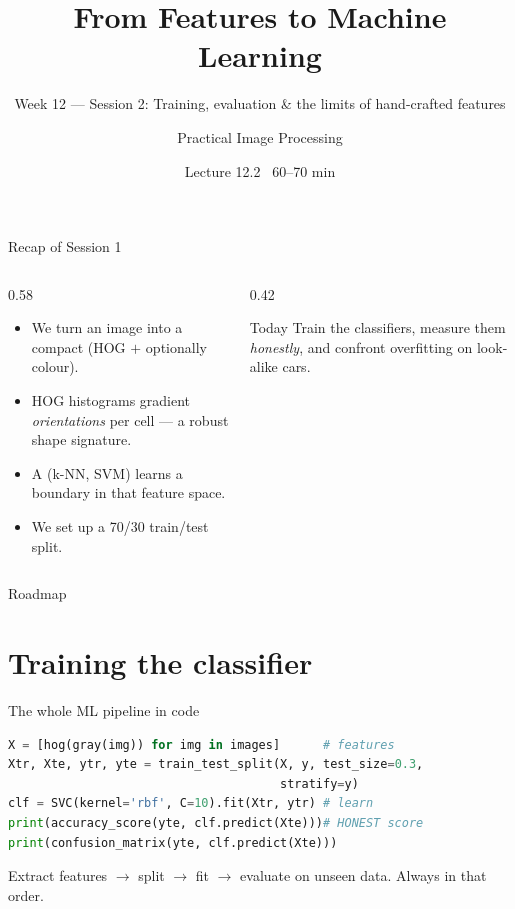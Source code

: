 \documentclass[10pt,aspectratio=169]{beamer}
\title{From Features to Machine Learning}
\subtitle{Week 12 — Session 2: Training, evaluation \& the limits of hand-crafted features}
\author{Practical Image Processing}
\date{Lecture 12.2 \textbullet\ 60--70 min}
\begin{document}
\maketitle

\begin{frame}{Recap of Session 1}
  \begin{columns}[T]
    \begin{column}{0.58\textwidth}
      \begin{itemize}
        \item We turn an image into a compact  (HOG $+$ optionally colour).
        \item HOG histograms gradient \emph{orientations} per cell — a robust shape signature.
        \item A  (k-NN, SVM) learns a boundary in that feature space.
        \item We set up a  70/30 train/test split.
      \end{itemize}
    \end{column}
    \begin{column}{0.42\textwidth}
      \begin{alertblock}{Today}
        Train the classifiers, measure them \emph{honestly}, and confront overfitting on look-alike cars.
      \end{alertblock}
    \end{column}
  \end{columns}
\end{frame}

\begin{frame}{Roadmap}\tableofcontents\end{frame}

\section{Training the classifier}

\begin{frame}[fragile]{The whole ML pipeline in code}
\begin{lstlisting}[language=Python]
X = [hog(gray(img)) for img in images]      # features
Xtr, Xte, ytr, yte = train_test_split(X, y, test_size=0.3,
                                      stratify=y)
clf = SVC(kernel='rbf', C=10).fit(Xtr, ytr) # learn
print(accuracy_score(yte, clf.predict(Xte)))# HONEST score
print(confusion_matrix(yte, clf.predict(Xte)))
\end{lstlisting}
  Extract features $\rightarrow$ split $\rightarrow$ fit $\rightarrow$ evaluate on unseen data. Always in that order.
\end{frame}
\end{document}
